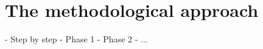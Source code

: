 \section{The methodological approach}
\label{MethodApproach}
- Step by step \nl
- Phase 1 \nl
- Phase 2 \nl 
- ... \nl